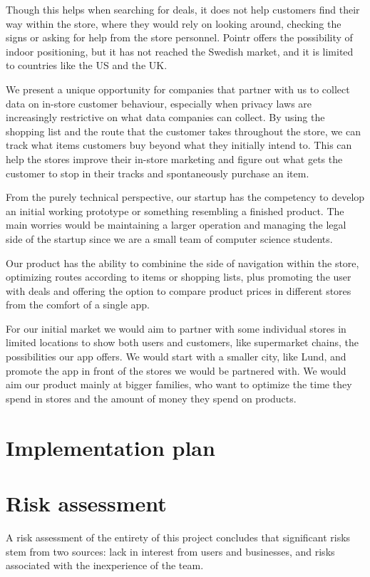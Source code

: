 \documentclass[titlepage]{article}
\begin{document}
Though this helps when searching for deals, it does not help customers find their way within the store, where they would rely on looking around, checking the signs or asking for help from the store personnel. Pointr offers the possibility of indoor positioning, but it has not reached the Swedish market, and it is limited to countries like the US and the UK. 

We present a unique opportunity for companies that partner with us to collect data on in-store customer behaviour, especially when privacy laws are increasingly restrictive on what data companies can collect. By using the shopping list and the route that the customer takes throughout the store, we can track what items customers buy beyond what they initially intend to. This can help the stores improve their in-store marketing and figure out what gets the customer to stop in their tracks and spontaneously purchase an item.

From the purely technical perspective, our startup has the competency to develop an initial working prototype or something resembling a finished product. The main worries would be maintaining a larger operation and managing the legal side of the startup since we are a small team of computer science students.

Our product has the ability to combinine the side of navigation within the store, optimizing routes according to items or shopping lists, plus promoting the user with deals and offering the option to compare product prices in different stores from the comfort of a single app.

For our initial market we would aim to partner with some individual stores in limited locations to show both users and customers, like supermarket chains, the possibilities our app offers. We would start with a smaller city, like Lund, and promote the app in front of the stores we would be partnered with. We would aim our product mainly at bigger families, who want to optimize the time they spend in stores and the amount of money they spend on products.

\section{Implementation plan}

\section{Risk assessment}

A risk assessment of the entirety of this project concludes that significant risks stem from two sources: lack in interest from users and businesses, and risks associated with the inexperience of the team.
\end{document}
